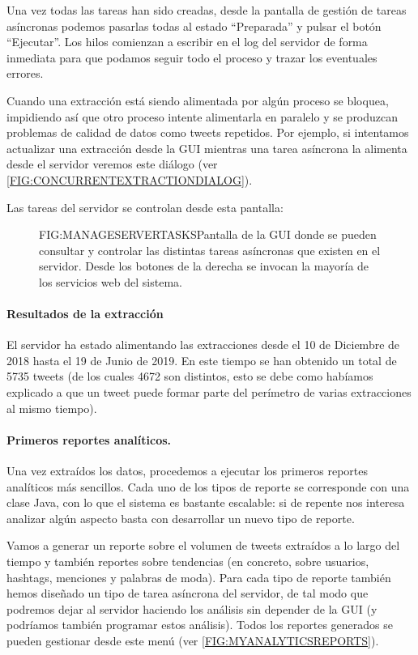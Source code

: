 Una vez todas las tareas han sido creadas, desde la pantalla de gestión de tareas asíncronas podemos pasarlas todas al estado ``Preparada'' y pulsar el botón ``Ejecutar''. Los hilos comienzan a escribir en el log del servidor de forma inmediata para que podamos seguir todo el proceso y trazar los eventuales errores. 

Cuando una extracción está siendo alimentada por algún proceso se bloquea, impidiendo así que otro proceso intente alimentarla en paralelo y se produzcan problemas de calidad de datos como tweets repetidos. Por ejemplo, si intentamos actualizar una extracción desde la GUI mientras una tarea asíncrona la alimenta desde el servidor veremos este diálogo (ver \ref{FIG:CONCURRENTEXTRACTIONDIALOG}).

 Las tareas del servidor se controlan desde esta pantalla:
 
 \begin{figure}[Menú de gestion de tareas asíncronas del servidor]{FIG:MANAGESERVERTASKS}{Pantalla de la GUI donde se pueden consultar y controlar las distintas tareas asíncronas que existen en el servidor. Desde los botones de la derecha se invocan la mayoría de los servicios web del sistema.}
\end{figure}

\paragraph{Resultados de la extracción}
El servidor ha estado alimentando las extracciones desde el 10 de Diciembre de 2018 hasta el 19 de Junio de 2019. En este tiempo se han obtenido un total de 5735 tweets (de los cuales 4672 son distintos, esto se debe como habíamos explicado a que un tweet puede formar parte del perímetro de varias extracciones al mismo tiempo).

\paragraph{Primeros reportes analíticos.}
Una vez extraídos los datos, procedemos a ejecutar los primeros reportes analíticos más sencillos. Cada uno de los tipos de reporte se corresponde con una clase Java, con lo que el sistema es bastante escalable: si de repente nos interesa analizar algún aspecto basta con desarrollar un nuevo tipo de reporte.

 Vamos a generar un reporte sobre el volumen de tweets extraídos a lo largo del tiempo y también reportes sobre tendencias (en concreto, sobre usuarios, hashtags, menciones y palabras de moda). Para cada tipo de reporte también hemos diseñado un tipo de tarea asíncrona del servidor, de tal modo que podremos dejar al servidor haciendo los análisis sin depender de la GUI (y podríamos también programar estos análisis). Todos los reportes generados se pueden gestionar desde este menú (ver \ref{FIG:MYANALYTICSREPORTS}).
 
